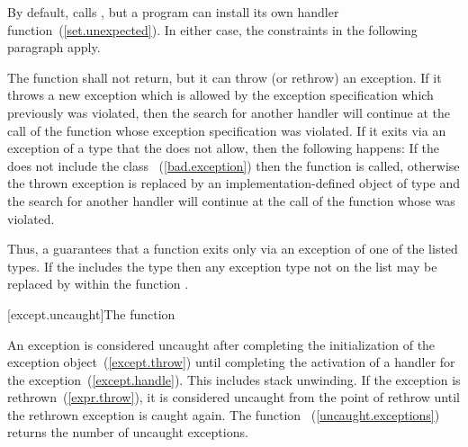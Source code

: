 \pnum
\enternote By default,  calls , but a
program can install its own handler function~(\ref{set.unexpected}). In either case, the
constraints in the following paragraph apply. \exitnote

\pnum
The
function shall not return, but it can throw (or rethrow) an exception.
If it throws a new exception which is allowed by the exception specification
which previously was violated, then the search for another handler
will continue at the call of the function whose exception specification was violated.
If it exits via an exception of a type that the
does not allow,
then the following happens:
%
If the
does not include the class
~(\ref{bad.exception})
then the function
is called, otherwise the thrown exception is replaced by an
implementation-defined object of type
and the search for another handler will continue at the call of the function
whose
was violated.

\pnum
\enternote
Thus,
a 
guarantees that a function exits only via an exception of one of the listed types.
If the
includes the type
then any exception type not on the list may be replaced by
within the function
.
\exitnote

[except.uncaught]{The  function}%

\pnum
An exception is considered uncaught
after completing the initialization of the exception object~(\ref{except.throw})
until completing the activation of a handler for the exception~(\ref{except.handle}).
This includes stack unwinding.
If the exception is rethrown~(\ref{expr.throw}),
it is considered uncaught from the point of rethrow
until the rethrown exception is caught again.
The function ~(\ref{uncaught.exceptions})
returns the number of uncaught exceptions.%
